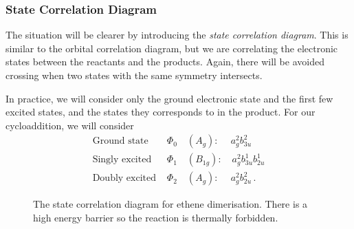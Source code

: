 \documentclass{article}
\theoremstyle{plain}\theoremheaderfont{\normalfont\itshape}\theorembodyfont{\rmfamily}\theoremseparator{.}\newtheorem*{rem}{Remark}\newtheorem*{ex}{Example}\newtheorem*{proof}{Proof}\newtheorem*{altp}{Alternative proof}
\theoremstyle{plain}\theoremheaderfont{\normalfont\bfseries}\theorembodyfont{\rmfamily}\theoremseparator{.}\newtheorem{thm}{Theorem}[section]\newtheorem{lem}[thm]{Lemma}\newtheorem{prop}[thm]{Proposition}\newtheorem*{cor}{Corollary}\newtheorem{defn}[thm]{Definition}\newtheorem{clm}[thm]{Claim}\newtheorem{clminproof}{Claim}\newtheorem{pos}{Postulate}[section]
\theoremstyle{break}\theoremheaderfont{\normalfont\itshape}\theorembodyfont{\rmfamily}\theoremseparator{.\medskip}\newtheorem*{proofskip}{Proof}\newtheorem*{exs}{Examples}\newtheorem*{rems}{Remarks}
\theoremstyle{break}\theoremheaderfont{\normalfont\bfseries}\theorembodyfont{\rmfamily}\theoremseparator{.\medskip}\newtheorem{lemskip}[thm]{Lemma}\newtheorem{defnskip}[thm]{Definition}\newtheorem{propskip}[thm]{Proposition}\newtheorem{thmskip}[thm]{Theorem}
\numberwithin{equation}{section}
\begin{document}
    \subsubsection{State Correlation Diagram}
    The situation will be clearer by introducing the \textit{state correlation diagram}. This is similar to the orbital correlation diagram, but we are correlating the electronic states between the reactants and the products. Again, there will be avoided crossing when two states with the same symmetry intersects.

    In practice, we will consider only the ground electronic state and the first few excited states, and the states they corresponds to in the product. For our cycloaddition, we will consider
    \begin{align}
        \text{Ground state }&\Phi_0\quad (A_g):\quad \ a_g^2b_{3u}^2 \\
        \text{Singly excited }&\Phi_1\quad (B_{1g}):\quad a_g^2b_{3u}^1b_{2u}^1 \\
        \text{Doubly excited }&\Phi_2\quad (A_g): \quad \ a_g^2b_{2u}^2\,.
    \end{align}

    \begin{figure}
        \centering
        \caption{The state correlation diagram for ethene dimerisation. There is a high energy barrier so the reaction is thermally forbidden.}
    \end{figure}
\end{document}
